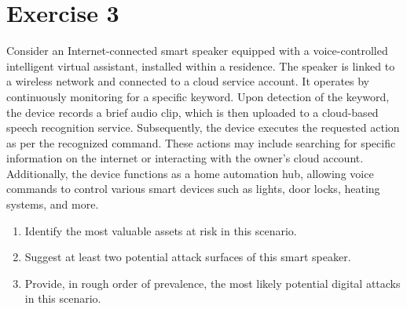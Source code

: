 \section{Exercise 3}

Consider an Internet-connected smart speaker equipped with a voice-controlled intelligent virtual assistant, installed within a residence.
The speaker is linked to a wireless network and connected to a cloud service account.
It operates by continuously monitoring for a specific keyword. 
Upon detection of the keyword, the device records a brief audio clip, which is then uploaded to a cloud-based speech recognition service.
Subsequently, the device executes the requested action as per the recognized command.
These actions may include searching for specific information on the internet or interacting with the owner's cloud account.
Additionally, the device functions as a home automation hub, allowing voice commands to control various smart devices such as lights, door locks, heating systems, and more.
\begin{enumerate}
    \item Identify the most valuable assets at risk in this scenario.
    \item Suggest at least two potential attack surfaces of this smart speaker.
    \item Provide, in rough order of prevalence, the most likely potential digital attacks in this scenario.
\end{enumerate}

